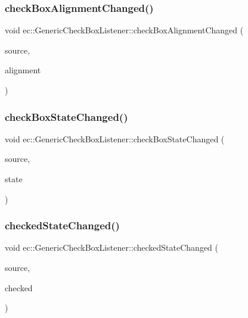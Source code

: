 \subsubsection{\texorpdfstring{check\+Box\+Alignment\+Changed()}{checkBoxAlignmentChanged()}}
{\footnotesize\ttfamily void ec\+::\+Generic\+Check\+Box\+Listener\+::check\+Box\+Alignment\+Changed (\begin{DoxyParamCaption}\item[{agui\+::\+Check\+Box $\ast$}]{source,  }\item[{agui\+::\+Area\+Alignment\+Enum}]{alignment }\end{DoxyParamCaption})\hspace{0.3cm}{\ttfamily [override]}}

\mbox{\label{classec_1_1_generic_check_box_listener_ae21003432ad938518b2f399e02689a5b}} 
\subsubsection{\texorpdfstring{check\+Box\+State\+Changed()}{checkBoxStateChanged()}}
{\footnotesize\ttfamily void ec\+::\+Generic\+Check\+Box\+Listener\+::check\+Box\+State\+Changed (\begin{DoxyParamCaption}\item[{agui\+::\+Check\+Box $\ast$}]{source,  }\item[{agui\+::\+Check\+Box\+::\+Check\+Box\+State\+Enum}]{state }\end{DoxyParamCaption})\hspace{0.3cm}{\ttfamily [override]}}

\mbox{\label{classec_1_1_generic_check_box_listener_a861ff5c1597ab9ef90ec051b2ddc90a1}} 
\subsubsection{\texorpdfstring{checked\+State\+Changed()}{checkedStateChanged()}}
{\footnotesize\ttfamily void ec\+::\+Generic\+Check\+Box\+Listener\+::checked\+State\+Changed (\begin{DoxyParamCaption}\item[{agui\+::\+Check\+Box $\ast$}]{source,  }\item[{agui\+::\+Check\+Box\+::\+Check\+Box\+Checked\+Enum}]{checked }\end{DoxyParamCaption})\hspace{0.3cm}{\ttfamily [override]}}

